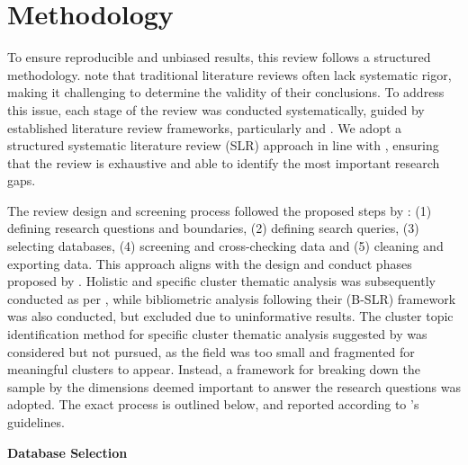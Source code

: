 \section{Methodology}
\label{sec:methodology}

To ensure reproducible and unbiased results, this review follows a structured methodology. \textcite{tranfield_et_al} note that traditional literature reviews often lack systematic rigor, making it challenging to determine the validity of their conclusions. To address this issue, each stage of the review was conducted systematically, guided by established literature review frameworks, particularly \textcite{snyder_2019} and \textcite{marzi_et_al_2024}. We adopt a structured systematic literature review (SLR) approach in line with \textcite{snyder_2019}, ensuring that the review is exhaustive and able to identify the most important research gaps. 

The review design and screening process followed the proposed steps by \textcite{marzi_et_al_2024}: (1) defining research questions and boundaries, (2) defining search queries, (3) selecting databases, (4) screening and cross-checking data and (5) cleaning and exporting data. This approach aligns with the design and conduct phases proposed by \textcite{snyder_2019}. Holistic and specific cluster thematic analysis was subsequently conducted as per \textcite{marzi_et_al_2024}, while bibliometric analysis following their (B-SLR) framework was also conducted, but excluded due to uninformative results. The cluster topic identification method for specific cluster thematic analysis suggested by \textcite{marzi_et_al_2024} was considered but not pursued, as the field was too small and fragmented for meaningful clusters to appear. Instead, a framework for breaking down the sample by the dimensions deemed important to answer the research questions was adopted. The exact process is outlined below, and reported according to \textcite{marzi_et_al_2024}'s guidelines.

\textbf{Database Selection}\nopagebreak

